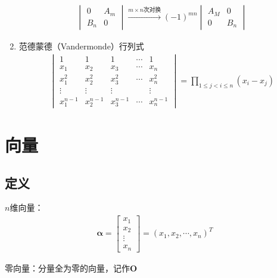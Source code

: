 \documentclass[12pt]{book}
\begin{document}
\begin{enumerate}[1.]
\begin{gather*}
\begin{vmatrix}
            0 & A_m \\
            B_n & 0 
        \end{vmatrix}
        \xrightarrow[]{m\times n\text{次对换}} (-1)^{mn}
        \begin{vmatrix}
            A_M & 0 \\
            0 & B_n
        \end{vmatrix} 
    \end{gather*}
    \item 范德蒙德（Vandermonde）行列式
    \begin{gather*}
        \begin{vmatrix}
            1           & 1           & 1           & \cdots & 1           \\
            x_{1}       & x_{2}       & x_{3}       & \cdots & x_{n}       \\ 
            x_{1}^{2}   & x_{2}^{2}   & x_{3}^{2}   & \cdots & x_{n}^{2}   \\
            \vdots      & \vdots      & \vdots      &        & \vdots      \\
            x_{1}^{n-1} & x_{2}^{n-1} & x_{3}^{n-1} & \cdots & x_{n}^{n-1} 
        \end{vmatrix}
        = \prod_{1\leqslant j<i\leqslant n}{ (x_i - x_j) }
    \end{gather*}
\end{enumerate}












\section{向量}



\subsection{定义}

$n$维向量：
\begin{gather*}
    \bm{\alpha} = \begin{bmatrix}
        x_1 \\ x_2 \\ \vdots \\ x_n
    \end{bmatrix}
    = (x_1,x_2,\cdots,x_n)^T
\end{gather*}
\par 零向量：分量全为零的向量，记作$\bm{O}$
\end{document}
